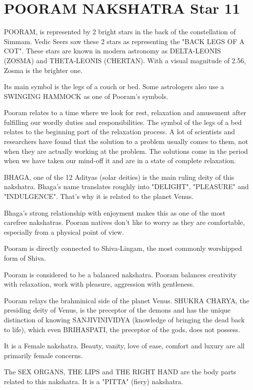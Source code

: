 \documentclass[12pt, right open]{memoir}
\begin{document}
\chapter{POORAM NAKSHATRA Star 11}


POORAM, is represented by 2 bright stars in the back of the constellation of Simmam.  Vedic Seers saw these 2 stars as representing the "BACK LEGS OF A COT". These stars are known in modern astronomy as DELTA-LEONIS (ZOSMA) and THETA-LEONIS (CHERTAN).  With a visual magnitude of 2.56, Zosma is the brighter one. 

Its main symbol is the legs of a couch or bed. Some astrologers also use a SWINGING HAMMOCK as one of Pooram's symbols. 

Pooram relates to a time where we look for rest, relaxation and amusement after fulfilling our wordly duties and responsibilities.  The symbol of the legs of a bed relates to the beginning part of the relaxation process. A lot of scientists and researchers have found that the solution to a problem usually comes to them, not when they are actually working at the problem.  The solutions come in the period when we have taken our mind-off it and are in a state of complete relaxation.  

BHAGA, one of the 12 Adityas (solar deities) is the main ruling deity of this nakshatra.  Bhaga's name translates roughly into "DELIGHT", "PLEASURE" and "INDULGENCE".  That's why it is related to the planet Venus. 

Bhaga's strong relationship with enjoyment makes this as one of the most carefree nakshatras.  Pooram natives don't like to worry as they are comfortable, especially from a physical point of view.  

Pooram is directly connected to Shiva-Lingam, the most commonly worshipped form of Shiva.  

Pooram is considered to be a balanced nakshatra.  Pooram balances creativity with relaxation, work with pleasure, aggression with gentleness.

Pooram relays the brahminical side of the planet Venus.  SHUKRA CHARYA, the presiding deity of Venus, is the preceptor of the demons and has the unique distinction of knowing SANJIVINIVIDYA (knowledge of bringing the dead back to life), which even BRIHASPATI, the preceptor of the gods, does not possess. 

It is a Female nakshatra. Beauty, vanity, love of ease, comfort and luxury are all primarily female concerns.  

The SEX ORGANS, THE LIPS and THE RIGHT HAND are the body parts related to this nakshatra. It is a "PITTA" (fiery) nakshatra.
\end{document}
